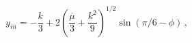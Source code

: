 \begin{equation}
y_{in}=-\frac{k}{3}+2\left(\frac{\overline{\mu}}{3}+
\frac{k^2}{9}\right)^{1/2}\sin(\pi/6-\phi)\,,
\end{equation}

